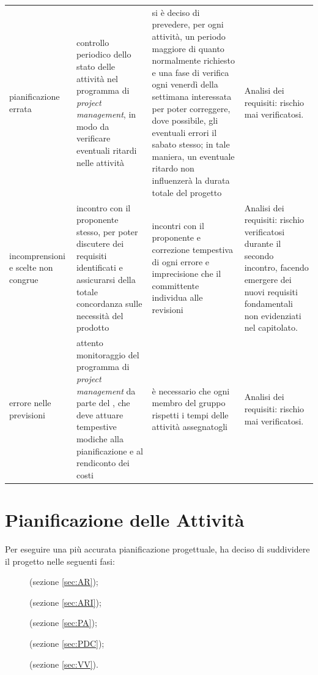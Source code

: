 \begin{adjustwidth}{-1cm}{-1cm}
\begin{center}
\begin{longtable}{| p{3cm} | p{3.5cm} | p{4cm} | p{3cm} |}
	pianificazione errata & controllo periodico dello stato delle attività nel programma di \emph{project management}, in modo da verificare eventuali ritardi nelle attività & si è deciso di prevedere, per ogni attività, un periodo maggiore di quanto normalmente richiesto e una fase di verifica ogni venerdì della settimana interessata per poter correggere, dove possibile, gli eventuali errori il sabato stesso; in tale maniera, un eventuale ritardo non influenzerà la durata totale del progetto & Analisi dei requisiti: rischio mai verificatosi. \\
	incomprensioni e scelte non congrue & incontro con il proponente stesso, per poter discutere dei requisiti identificati e assicurarsi della totale concordanza sulle necessità del prodotto & incontri con il proponente e correzione tempestiva di ogni errore e imprecisione che il committente individua alle revisioni & Analisi dei requisiti: rischio verificatosi durante il secondo incontro, facendo emergere dei nuovi requisiti fondamentali non evidenziati nel capitolato. \\
	errore nelle previsioni & attento monitoraggio del programma di \emph{project management} da parte del \Rx{}, che deve attuare tempestive modiche alla pianificazione e al rendiconto dei costi & è necessario che ogni membro del gruppo rispetti i tempi delle attività assegnatogli & Analisi dei requisiti: rischio mai verificatosi. \\
	\hline
\end{longtable}
\end{center}
\end{adjustwidth}






\section{Pianificazione delle Attività} \label{sec:pianificazione}
Per eseguire una più accurata pianificazione progettuale, \hx{} ha deciso di suddividere il progetto nelle seguenti fasi:
\begin{description}
	\item[\AR] (sezione \ref{sec:AR});
	\item[\ARI] (sezione \ref{sec:ARI});
	\item[\PA] (sezione \ref{sec:PA});
	\item[\PDC] (sezione \ref{sec:PDC});
	\item[\VV] (sezione \ref{sec:VV}).
\end{description}

